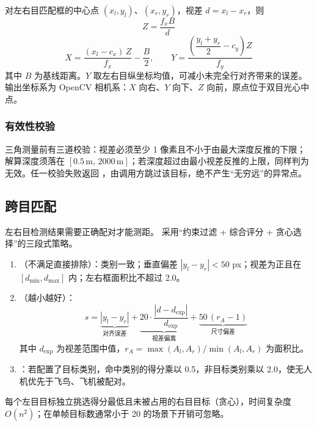 对左右目匹配框的中心点 $(x_l,y_l)$、$(x_r,y_r)$，视差 $d=x_l-x_r$，则
\begin{equation}
Z=\frac{f_x B}{d}
\end{equation}
\begin{equation}
X=\frac{(x_l-c_x)\,Z}{f_x}-\frac{B}{2},\qquad
Y=\frac{\left(\dfrac{y_l+y_r}{2}-c_y\right)Z}{f_y}
\end{equation}
其中 $B$ 为基线距离。$Y$ 取左右目纵坐标均值，可减小未完全行对齐带来的误差。输出坐标系为 OpenCV 相机系：$X$ 向右、$Y$ 向下、$Z$ 向前，原点位于双目光心中点。

\subsubsection{有效性校验}

三角测量前有三道校验：视差必须至少 1 像素且不小于由最大深度反推的下限；解算深度须落在 $[0.5\,\mathrm{m},\,2000\,\mathrm{m}]$；若深度超过由最小视差反推的上限，同样判为无效。任一校验失败返回 ，由调用方跳过该目标，绝不产生“无穷远”的异常点。

\subsection{跨目匹配}

左右目检测结果需要正确配对才能测距。 采用“约束过滤 + 综合评分 + 贪心选择”的三段式策略。

\begin{enumerate}
  \item {}（不满足直接排除）：类别一致；垂直偏差 $|y_l-y_r|<50$ px；视差为正且在 $[d_{\min},d_{\max}]$ 内；左右框面积比不超过 2.0。
  \item {}（越小越好）：
  \begin{equation}
  s=\underbrace{|y_l-y_r|}_{\text{对齐误差}}
   +\underbrace{20\cdot\frac{|d-d_{\text{exp}}|}{d_{\text{exp}}}}_{\text{视差偏离}}
   +\underbrace{50\,(r_A-1)}_{\text{尺寸偏差}}
  \end{equation}
  其中 $d_{\text{exp}}$ 为视差范围中值，$r_A=\max(A_l,A_r)/\min(A_l,A_r)$ 为面积比。
  \item {}：若配置了目标类别，命中类别的得分乘以 0.5，非目标类别乘以 2.0，使无人机优先于飞鸟、飞机被配对。
\end{enumerate}

每个左目目标独立挑选得分最低且未被占用的右目目标（贪心），时间复杂度 $O(n^2)$；在单帧目标数通常小于 20 的场景下开销可忽略。

